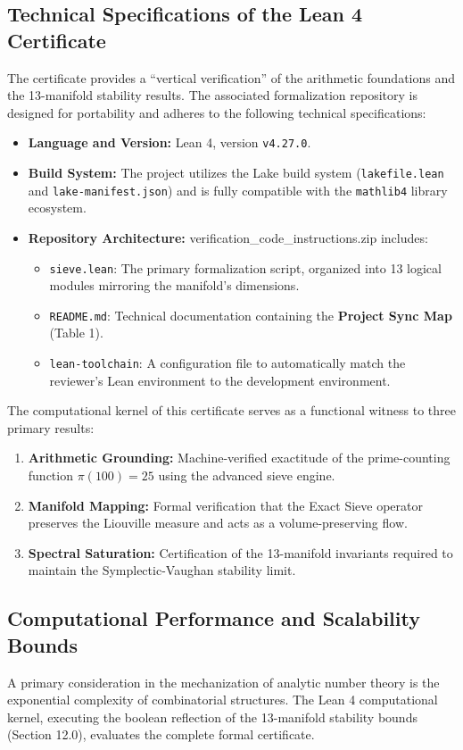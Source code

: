 \documentclass[sn-mathphys-num, pdflatex, referee]{sn-jnl}
\begin{document}
\subsection{Technical Specifications of the Lean 4 Certificate} The certificate provides a ``vertical verification'' of the arithmetic foundations and the 13-manifold stability results. The associated formalization repository is designed for portability and adheres to the following technical specifications:

\begin{itemize}
\item \textbf{Language and Version:} Lean 4, version \texttt{v4.27.0}.
\item \textbf{Build System:} The project utilizes the Lake build system (\texttt{lakefile.lean} and \texttt{lake-manifest.json}) and is fully compatible with the \texttt{mathlib4} library ecosystem.
\item \textbf{Repository Architecture:} verification\_code\_instructions.zip includes:
\begin{itemize}
    \item \texttt{sieve.lean}: The primary formalization script, organized into 13 logical modules mirroring the manifold's dimensions.
    \item \texttt{README.md}: Technical documentation containing the \textbf{Project Sync Map} (Table 1).
    \item \texttt{lean-toolchain}: A configuration file to automatically match the reviewer's Lean environment to the development environment.
    \end{itemize}
\end{itemize}

The computational kernel of this certificate serves as a functional witness to three primary results:
\begin{enumerate}
    \item \textbf{Arithmetic Grounding:} Machine-verified exactitude of the prime-counting function $\pi(100) = 25$ using the advanced sieve engine.
    \item \textbf{Manifold Mapping:} Formal verification that the Exact Sieve operator preserves the Liouville measure and acts as a volume-preserving flow.
    \item \textbf{Spectral Saturation:} Certification of the 13-manifold invariants required to maintain the Symplectic-Vaughan stability limit.
\end{enumerate}

\subsection{Computational Performance and Scalability Bounds}
A primary consideration in the mechanization of analytic number theory is the exponential complexity of combinatorial structures. The Lean 4 computational kernel, executing the boolean reflection of the 13-manifold stability bounds (Section 12.0), evaluates the complete formal certificate. 
\end{document}
